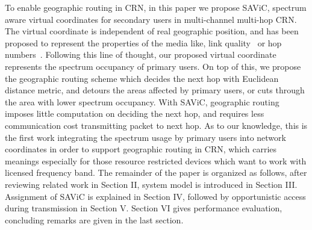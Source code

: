 To enable geographic routing in CRN, in this paper we propose SAViC, spectrum aware virtual coordinates for secondary users in multi-channel multi-hop CRN.
The virtual coordinate is independent of real geographic position, and has been proposed to represent the properties of the media like, link quality~\cite{Alizai_11_probabilisticAddressing} or hop numbers~\cite{gpsfree05infocom}.
Following this line of thought, our proposed virtual coordinate represents the spectrum occupancy of primary users. 
On top of this, we propose the geographic routing scheme which decides the next hop with Euclidean distance metric, and detours the areas affected by primary users, or cuts through the area with lower spectrum occupancy.
With SAViC, geographic routing imposes little computation on deciding the next hop, and requires less communication cost transmitting packet to next hop.
As to our knowledge, this is the first work integrating the spectrum usage by primary users into network coordinates in order to support geographic routing in CRN, which carries meanings especially for those resource restricted devices which want to work with licensed frequency band.
The remainder of the paper is organized as follows, after reviewing related work in Section II, system model is introduced in Section III.
Assignment of SAViC is explained in Section IV, followed by opportunistic access during transmission in Section V.
Section VI gives performance evaluation, concluding remarks are given in the last section.


